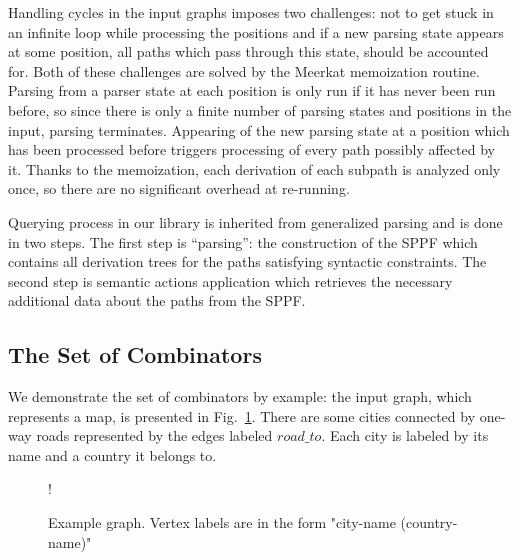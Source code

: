 Handling cycles in the input graphs imposes two challenges: not to get stuck in an infinite loop while processing the positions and if a new parsing state appears at some position, all paths which pass through this state, should be accounted for.
Both of these challenges are solved by the Meerkat memoization routine.
Parsing from a parser state at each position is only run if it has never been run before, so since there is only a finite number of parsing states and positions in the input, parsing terminates.
Appearing of the new parsing state at a position which has been processed before triggers processing of every path possibly affected by it.
Thanks to the memoization, each derivation of each subpath is analyzed only once, so there are no significant overhead at re-running.


Querying process in our library is inherited from generalized parsing and is done in two steps.
The first step is ``parsing'': the construction of the SPPF which contains all derivation trees for the paths satisfying syntactic constraints.
The second step is semantic actions application which retrieves the necessary additional data about the paths from the SPPF.

\subsection{The Set of Combinators}

We demonstrate the set of combinators by example: the input graph, which represents a map, is presented in Fig.~\ref{fig:graph}.
There are some cities connected by one-way roads represented by the edges labeled $road\_to$.
Each city is labeled by its name and a country it belongs to.

\begin{figure}[h]
 {!}
{
}
\caption{Example graph. Vertex labels are in the form "city-name (country-name)"}
\label{fig:graph}
\end{figure}

